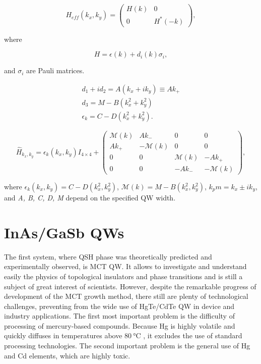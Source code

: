 \documentclass[titlepage,a4paper]{book}
\newcommand{\wciecie}{\quad\phantom{v}}
\begin{document}
\begin{equation}
\label{2}
H_{eff}(k_x, k_y) =  \left( \begin{array}{cc}
H(k) & 0 \\
0 & H^*(-k) \end{array} \right),
\end{equation}

where 

\begin{equation}
\label{3}
H = \epsilon (k) + d_i (k) \sigma_i,
\end{equation}

and $\sigma_i$ are Pauli matrices.

\begin{equation}
\begin{aligned}
\label{4}
d_1 + id_2 = A(k_x + ik_y) \equiv Ak_+ \\
d_3 = M - B(k_x^2 + k_y^2) \\
\epsilon_k = C - D(k_x^2 + k_y^2).
\end{aligned}
\end{equation}

\begin{equation}
\label{asd}
\hat{H}_{k_x, k_y} = \epsilon_k(k_x, k_y) I_{4 \times 4} + \left( \begin{array}{cccc}
\mathcal{M}(k) & Ak_- & 0 & 0 \\
Ak_+ & -\mathcal{M}(k) & 0 & 0 \\
0 & 0 & \mathcal{M}(k) & -Ak_+ \\
0 & 0 & -Ak_- & -\mathcal{M}(k) \end{array} \right),
\end{equation}

where $\epsilon_k(k_x, k_y) = C - D(k_x^2, k_y^2)$, $\mathcal{M}(k) = M - B(k_x^2, k_y^2)$, $k_pm = k_x \pm ik_y$, and \textit{A, B, C, D, M} depend on the specified QW width.

\chapter{InAs/GaSb QWs}
\wciecie
The first system, where QSH phase was theoretically predicted and experimentally observed, is MCT QW. It allows to investigate and understand easily the physics of topological insulators and phase transitions and is still a subject of great interest of scientists. However, despite the remarkable progress of development of the MCT growth method, there still are plenty of technological challenges, preventing from the wide use of HgTe/CdTe QW in device and industry applications. The first most important problem is the difficulty of processing of mercury-based compounds. Because Hg is highly volatile and quickly diffuses in temperatures above $\SI{80}{\degreeCelsius}$ \cite{Daumer_MCT_temperature}, it excludes the use of standard processing technologies. The second important problem is the general use of Hg and Cd elements, which are highly toxic.
\end{document}
